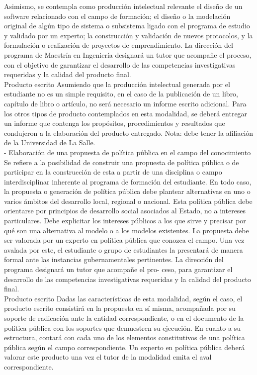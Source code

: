 Asimismo, se contempla como producción intelectual relevante el diseño de un software relacionado con el campo de formación; el diseño o la modelación original de algún tipo de sistema o subsistema ligado con el programa de estudio y validado por un experto; la construcción y validación de nuevos protocolos, y la formulación o realización de proyectos de emprendimiento. La dirección del programa de Maestría en Ingeniería designará un tutor que acompañe el proceso, con el objetivo de garantizar
el desarrollo de las competencias investigativas requeridas y la calidad del producto final.
\\[1cm]
Producto escrito
Asumiendo que la producción intelectual generada por el estudiante no es un simple requisito, en el caso de la publicación de un libro, capítulo de libro o artículo, no será necesario un informe escrito adicional. Para los otros tipos de producto contemplados en esta modalidad, se deberá entregar un informe que contenga los propósitos, procedimientos y resultados que condujeron a la elaboración del producto entregado. Nota: debe tener la afiliación de la Universidad de La Salle.
\\[1cm]
-	Elaboración de una propuesta de política pública en el campo del conocimiento
Se refiere a la posibilidad de construir una propuesta de política pública o de participar en la construcción de esta a partir de una disciplina o campo interdisciplinar inherente al programa de formación del estudiante. En todo caso, la propuesta o generación de política pública debe plantear alternativas en uno o varios ámbitos del desarrollo local, regional o nacional.
Esta política pública debe orientarse por principios de desarrollo social asociados al Estado, no a intereses particulares. Debe explicitar los intereses públicos a los que sirve y precisar por qué son una alternativa al modelo o a los modelos existentes. La propuesta debe ser valorada por un experto en política pública que conozca el campo. Una vez avalada por este, el estudiante o grupo de estudiantes la presentará de manera formal ante las instancias gubernamentales pertinentes. La dirección del programa
designará un tutor que acompañe el pro- ceso, para garantizar el desarrollo de las competencias investigativas requeridas y la calidad del producto final.
\\[1cm]
Producto escrito
Dadas las características de esta modalidad, según el caso, el producto escrito consistirá en la propuesta en sí misma, acompañada por su soporte de radicación ante la entidad correspondiente, o en el documento de la política pública con los soportes que demuestren su ejecución. En cuanto a su estructura, contará con cada uno de los elementos constitutivos de una política pública según el campo correspondiente. Un experto en política pública deberá valorar este producto una vez el tutor de la modalidad emita el aval correspondiente.


